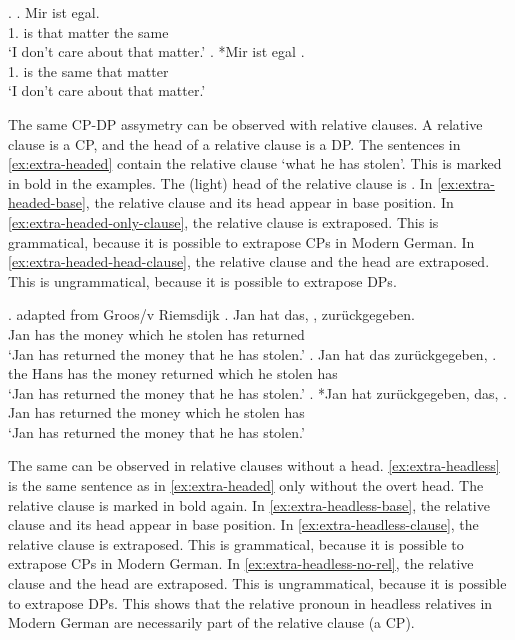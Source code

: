 \ex.\label{ex:mg-extrapose-dp}
\ag. Mir ist   egal.\\
 1. is that matter {the same}\\
 `I don't care about that matter.' \label{ex:mg-extrapose-dp-base}
\bg. *Mir ist egal  .\\
 1. is {the same} that matter\\
 `I don't care about that matter.' \label{ex:mg-extrapose-dp-moved}

The same CP-DP assymetry can be observed with relative clauses. A relative clause is a CP, and the head of a relative clause is a DP. The sentences in \ref{ex:extra-headed} contain the relative clause  `what he has stolen'. This is marked in bold in the examples. The (light) head of the relative clause is .
In \ref{ex:extra-headed-base}, the relative clause and its head appear in base position. In \ref{ex:extra-headed-only-clause}, the relative clause is extraposed. This is grammatical, because it is possible to extrapose CPs in Modern German. In \ref{ex:extra-headed-head-clause}, the relative clause and the head are extraposed. This is ungrammatical, because it is possible to extrapose DPs.

\ex. \label{ex:extra-headed} adapted from Groos/v Riemsdijk
\ag. Jan hat das,    , zurückgegeben.\\
Jan has the money which he stolen has returned\\
\glt `Jan has returned the money that he has stolen.'\label{ex:extra-headed-base}
\bg. Jan hat das zurückgegeben,    .\\
the Hans has the money returned which he stolen has\\
\glt `Jan has returned the money that he has stolen.'\label{ex:extra-headed-only-clause}
\cg. *Jan hat zurückgegeben, das,    .\\
Jan has returned the money which he stolen has\\
\glt `Jan has returned the money that he has stolen.'\label{ex:extra-headed-head-clause}

The same can be observed in relative clauses without a head. \ref{ex:extra-headless} is the same sentence as in \ref{ex:extra-headed} only without the overt head. The relative clause is marked in bold again.
In \ref{ex:extra-headless-base}, the relative clause and its head appear in base position. In \ref{ex:extra-headless-clause}, the relative clause is extraposed. This is grammatical, because it is possible to extrapose CPs in Modern German. In \ref{ex:extra-headless-no-rel}, the relative clause and the head are extraposed. This is ungrammatical, because it is possible to extrapose DPs.
This shows that the relative pronoun in headless relatives in Modern German are necessarily part of the relative clause (a CP).

